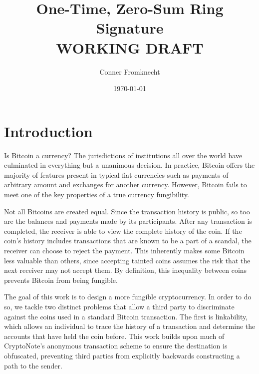 \documentclass{article}
\begin{document}
\title{One-Time, Zero-Sum Ring Signature \\ {\small WORKING DRAFT}}
\author{Conner Fromknecht}
\date{\today}

\maketitle

\section{Introduction}
  
Is Bitcoin a currency?  The jurisdictions of institutions all over the world
have culminated in everything but a unanimous decision.  In practice, Bitcoin
offers the majority of features present in typical fiat currencies such as
payments of arbitrary amount and exchanges for another currency.  However,
Bitcoin fails to meet one of the key properties of a true currency\textemdash
fungibility.

Not all Bitcoins are created equal.  Since the transaction history is public, so
too are the balances and payments made by its participants.  After any
transaction is completed, the receiver is able to view the complete history of
the coin. If the coin's history includes transactions that are known to be a
part of a scandal, the receiver can choose to reject the payment.  This
inherently makes some Bitcoin less valuable than others, since accepting tainted
coins assumes the risk that the next receiver may not accept them.  By
definition, this inequality between coins prevents Bitcoin from being fungible.

The goal of this work is to design a more fungible cryptocurrency.  In order to
do so, we tackle two distinct problems that allow a third party to discriminate
against the coins used in a standard Bitcoin transaction.  The first is
linkability, which allows an individual to trace the history of a transaction
and determine the accounts that have held the coin before.  This work builds
upon  much of CryptoNote's \cite{S13} anonymous transaction scheme to ensure
the destination is obfuscated, preventing third parties from explicitly
backwards constructing a path to the sender.  
\end{document}

